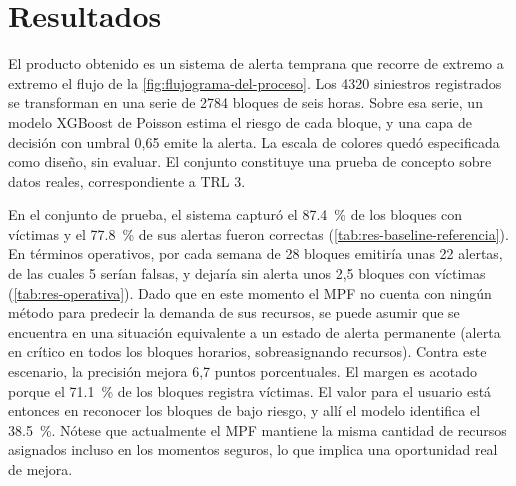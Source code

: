 \chapter{Resultados}\label{cap:resultados}

El producto obtenido es un sistema de alerta temprana que recorre de extremo a extremo el flujo de la \cref{fig:flujograma-del-proceso}. Los 4320 siniestros registrados se transforman en una serie de 2784 bloques de seis horas. Sobre esa serie, un modelo XGBoost de Poisson estima el riesgo de cada bloque, y una capa de decisión con umbral 0,65 emite la alerta. La escala de colores quedó especificada como diseño, sin evaluar. El conjunto constituye una prueba de concepto sobre datos reales, correspondiente a TRL 3.

En el conjunto de prueba, el sistema capturó el \qty{87.4}{\percent} de los bloques con víctimas y el \qty{77.8}{\percent} de sus alertas fueron correctas (\cref{tab:res-baseline-referencia}). En términos operativos, por cada semana de 28 bloques emitiría unas 22 alertas, de las cuales 5 serían falsas, y dejaría sin alerta unos 2,5 bloques con víctimas (\cref{tab:res-operativa}). Dado que en este momento el MPF no cuenta con ningún método para predecir la demanda de sus recursos, se puede asumir que se encuentra en una situación equivalente a un estado de alerta permanente (alerta en crítico en todos los bloques horarios, sobreasignando recursos). Contra este escenario, la precisión mejora 6,7 puntos porcentuales. El margen es acotado porque el \qty{71.1}{\percent} de los bloques registra víctimas. El valor para el usuario está entonces en reconocer los bloques de bajo riesgo, y allí el modelo identifica el \qty{38.5}{\percent}. Nótese que actualmente el MPF mantiene la misma cantidad de recursos asignados incluso en los momentos seguros, lo que implica una oportunidad real de mejora.

